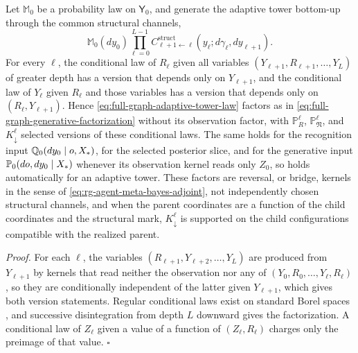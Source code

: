 Let $\mathbb M_0$ be a probability law on $\mathsf Y_0$, and generate the adaptive
tower bottom-up through the common structural channels,
\begin{equation}
\mathbb M_0(dy_0)\prod_{\ell=0}^{L-1}
C^{\mathrm{struct}}_{\ell+1\leftarrow\ell}(y_\ell;d\gamma_\ell,dy_{\ell+1}).
\label{eq:full-graph-adaptive-tower-law}
\end{equation}
For every $\ell$, the conditional law of $R_\ell$ given all variables
$(Y_{\ell+1},R_{\ell+1},\ldots,Y_L)$ of greater depth has a version that depends only
on $Y_{\ell+1}$, and the conditional law of $Y_\ell$ given $R_\ell$ and those variables
has a version that depends only on $(R_\ell,Y_{\ell+1})$. Hence
\eqref{eq:full-graph-adaptive-tower-law} factors as in
\eqref{eq:full-graph-generative-factorization} without its observation factor, with
$\mathbb P^\ell_R$, $\mathbb P^\ell_{\mathfrak N}$, and $K^\ell_\downarrow$ selected
versions of these conditional laws. The same holds for the recognition input $\mathbb
Q_0(dy_0\mid o,X_*)$, for the selected posterior slice, and for the generative input
$\mathbb P_0(do,dy_0\mid X_*)$ whenever its observation kernel reads only $Z_0$, so
 holds automatically for an adaptive tower. These
factors are reversal, or bridge, kernels in the sense of
\eqref{eq:rg-agent-meta-bayes-adjoint}, not independently chosen structural
channels, and when the parent coordinates are a function of the child coordinates and
the structural mark, $K^\ell_\downarrow$ is supported on the child configurations
compatible with the realized parent. 

\noindent\emph{Proof.}
For each $\ell$, the variables $(R_{\ell+1},Y_{\ell+2},\ldots,Y_L)$ are produced from
$Y_{\ell+1}$ by kernels that read neither the observation nor any of
$(Y_0,R_0,\ldots,Y_\ell,R_\ell)$, so they are conditionally independent of the latter
given $Y_{\ell+1}$, which gives both version statements. Regular conditional laws
exist on standard Borel spaces \citep{Kallenberg2021}, and successive disintegration
from depth $L$ downward gives the factorization. A conditional law of $Z_\ell$ given a
value of a function of $(Z_\ell,R_\ell)$ charges only the preimage of that value.
$\square$

